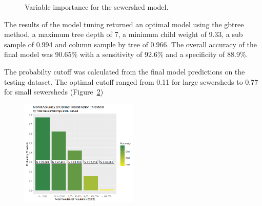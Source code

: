 \documentclass[
  letterpaper,
  DIV=11,
  numbers=noendperiod]{scrartcl}
\begin{document}
\begin{figure}


\caption{\label{fig-importance}Variable importance for the sewershed
model.}

\end{figure}%

The results of the model tuning returned an optimal model using the
gbtree method, a maximum tree depth of 7, a minimum child weight of
9.33, a sub sample of 0.994 and column sample by tree of 0.966. The
overall accuracy of the final model was 90.65\% with a sensitivity of
92.6\% and a specificity of 88.9\%.

The probabilty cutoff was calculated from the final model predictions on
the testing dataset. The optimal cutoff ranged from 0.11 for large
sewersheds to 0.77 for small sewersheds (Figure~\ref{fig-probabilities})

\begin{figure}

\captionsetup{labelsep=none}\includegraphics[width=0.5\textwidth,height=\textheight]{img/probability.png}

\caption{\label{fig-probabilities}}

\end{figure}%
\end{document}
